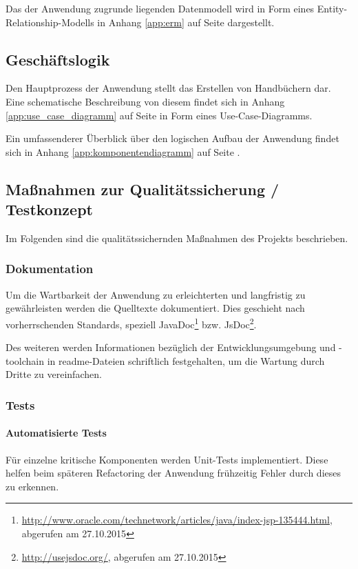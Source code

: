 \documentclass[12pt, xcolor=dvipsnames]{scrartcl}
\begin{document}
Das der Anwendung zugrunde liegenden Datenmodell wird in Form eines Entity-Relationship-Modells in Anhang \ref{app:erm} auf Seite \pageref{app:erm} dargestellt.

\subsection{Geschäftslogik}

Den Hauptprozess der Anwendung stellt das Erstellen von Handbüchern dar. Eine schematische Beschreibung von diesem findet sich in Anhang \ref{app:use_case_diagramm} auf Seite \pageref{app:use_case_diagramm} in Form eines Use-Case-Diagramms.

Ein umfassenderer Überblick über den logischen Aufbau der Anwendung findet sich in Anhang \ref{app:komponentendiagramm} auf Seite \pageref{app:komponentendiagramm}.

\subsection{Maßnahmen zur Qualitätssicherung / Testkonzept}

Im Folgenden sind die qualitätssichernden Maßnahmen des Projekts beschrieben.

\subsubsection*{Dokumentation}
Um die Wartbarkeit der Anwendung zu erleichterten und langfristig zu gewährleisten werden die Quelltexte dokumentiert. Dies geschieht nach vorherrschenden Standards, speziell
JavaDoc\footnote{\url{http://www.oracle.com/technetwork/articles/java/index-jsp-135444.html}, abgerufen am 27.10.2015}
bzw.
JsDoc\footnote{\url{http://usejsdoc.org/}, abgerufen am 27.10.2015}.

Des weiteren werden Informationen bezüglich der Entwicklungsumgebung und -toolchain in readme-Dateien schriftlich festgehalten, um die Wartung durch Dritte zu vereinfachen.

\subsubsection*{Tests}

\paragraph{Automatisierte Tests}
Für einzelne kritische Komponenten werden Unit-Tests implementiert. Diese helfen beim späteren Refactoring der Anwendung frühzeitig Fehler durch dieses zu erkennen.
\end{document}
